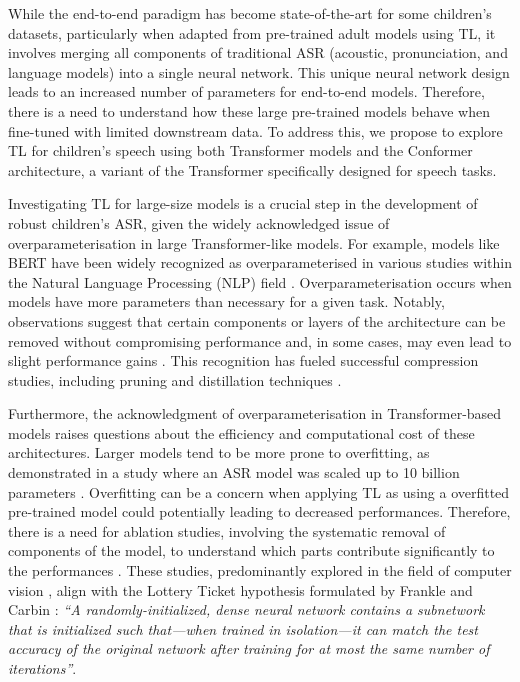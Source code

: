 While the end-to-end paradigm has become state-of-the-art for some children's datasets, particularly when adapted from pre-trained adult models using TL, it involves merging all components of traditional ASR (acoustic, pronunciation, and language models) into a single neural network. This unique neural network design leads to an increased number of parameters for end-to-end models. Therefore, there is a need to understand how these large pre-trained models behave when fine-tuned with limited downstream data. To address this, we propose to explore TL for children's speech using both Transformer models and the Conformer architecture, a variant of the Transformer specifically designed for speech tasks.


Investigating TL for large-size models is a crucial step in the development of robust children's ASR, given the widely acknowledged issue of overparameterisation in large Transformer-like models. For example, models like BERT \cite{Bert} have been widely recognized as overparameterised in various studies within the Natural Language Processing (NLP) field \cite{kovaleva-etal-2019-revealing,michel2019sixteen}. Overparameterisation occurs when models have more parameters than necessary for a given task. Notably, observations suggest that certain components or layers of the architecture can be removed without compromising performance and, in some cases, may even lead to slight performance gains \cite{kovaleva-etal-2019-revealing,michel2019sixteen,ye2023partial}. This recognition has fueled successful compression studies, including pruning and distillation techniques \cite{mccarley2019structured,sanh2019distilbert}.



Furthermore, the acknowledgment of overparameterisation in Transformer-based models raises questions about the efficiency and computational cost of these architectures. Larger models tend to be more prone to overfitting, as demonstrated in a study where an ASR model was scaled up to 10 billion parameters \cite{zheng22d_interspeech}. Overfitting can be a concern when applying TL as using a overfitted pre-trained model could potentially leading to decreased performances. Therefore, there is a need for ablation studies, involving the systematic removal of components of the model, to understand which parts contribute significantly to the performances \cite{shen2021partial,wang2021fine}. These studies, predominantly explored in the field of computer vision \cite{ye2023partial}, align with the Lottery Ticket hypothesis formulated by Frankle and Carbin \cite{frankle2018lottery}: \textit{``A randomly-initialized, dense neural network contains a subnetwork that is initialized such that—when trained in isolation—it can match the test accuracy of the original network after training for at most the same number of iterations''}.

